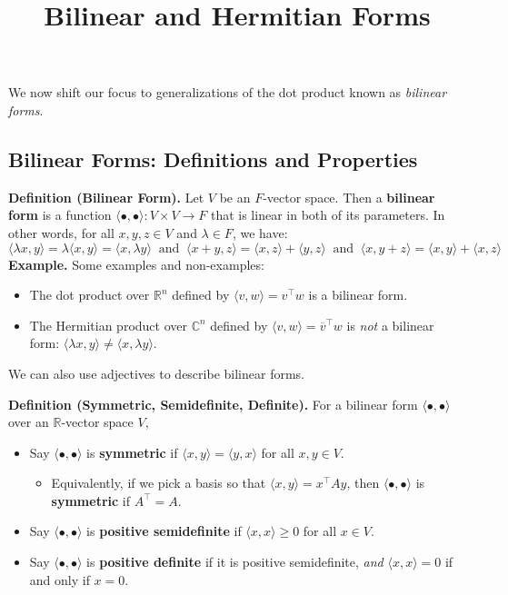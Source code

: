 \title{Bilinear and Hermitian Forms}



We now shift our focus to generalizations of the dot product known as \emph{bilinear forms}.

\subsection{Bilinear Forms: Definitions and Properties}

\textbf{Definition (Bilinear Form).} Let $V$ be an $F$-vector space.  Then a \textbf{bilinear form} is a function $\langle \bullet, \bullet \rangle: V \times V \to F$ that is linear in both of its parameters.  In other words, for all $x, y, z \in V$ and $\lambda \in F$, we have:
\[ \langle \lambda x, y \rangle = \lambda \langle x, y \rangle = \langle x, \lambda y \rangle ~ \text{ and } ~ \langle x + y, z \rangle = \langle x, z \rangle + \langle y, z \rangle ~ \text{ and } ~ \langle x, y + z \rangle = \langle x, y \rangle + \langle x, z \rangle \]
\textbf{Example.} Some examples and non-examples:
\begin{itemize}
    \item The dot product over $\mathbb{R}^n$ defined by $\langle v, w \rangle = v^{\top}w$ is a bilinear form.
    \item The Hermitian product over $\mathbb{C}^n$ defined by $\langle v, w \rangle = \overline{v}^{\top}w$ is \emph{not} a bilinear form: $\langle \lambda x, y \rangle \neq \langle x, \lambda y \rangle$.
\end{itemize}

We can also use adjectives to describe bilinear forms.

\textbf{Definition (Symmetric, Semidefinite, Definite).} For a bilinear form $\langle \bullet, \bullet \rangle$ over an $\mathbb{R}$-vector space $V$,
\begin{itemize}
    \item Say $\langle \bullet ,\bullet \rangle$ is \textbf{symmetric} if $\langle x, y \rangle = \langle y, x \rangle$ for all $x, y \in V$.
    \begin{itemize}
        \item Equivalently, if we pick a basis so that $\langle x, y \rangle = x^{\top} A y$, then $\langle \bullet, \bullet \rangle$ is \textbf{symmetric} if $A^{\top} = A$.
    \end{itemize}
    \item Say $\langle \bullet, \bullet \rangle$ is \textbf{positive semidefinite} if $\langle x, x \rangle \geq 0$ for all $x \in V$.
    \item Say $\langle \bullet, \bullet \rangle$ is \textbf{positive definite} if it is positive semidefinite, \emph{and} $\langle x, x \rangle = 0$ if and only if $x = 0$.
\end{itemize}


